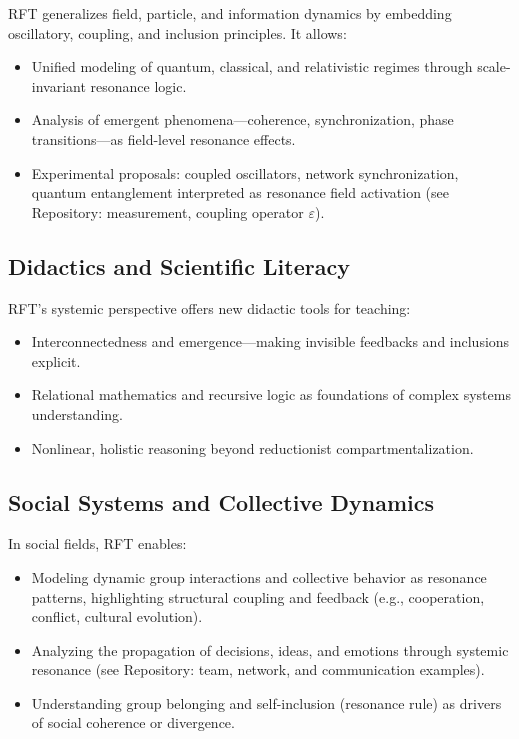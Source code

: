 \documentclass[12pt]{iopart}
\begin{document}
RFT generalizes field, particle, and information dynamics by embedding oscillatory, coupling, and inclusion principles. It allows:
\begin{itemize}
	\item Unified modeling of quantum, classical, and relativistic regimes through scale-invariant resonance logic.
	\item Analysis of emergent phenomena—coherence, synchronization, phase transitions—as field-level resonance effects.
	\item Experimental proposals: coupled oscillators, network synchronization, quantum entanglement interpreted as resonance field activation (see Repository: measurement, coupling operator $\varepsilon$).
\end{itemize}

\subsection{Didactics and Scientific Literacy}

RFT’s systemic perspective offers new didactic tools for teaching:
\begin{itemize}
	\item Interconnectedness and emergence—making invisible feedbacks and inclusions explicit.
	\item Relational mathematics and recursive logic as foundations of complex systems understanding.
	\item Nonlinear, holistic reasoning beyond reductionist compartmentalization.
\end{itemize}

\subsection{Social Systems and Collective Dynamics}

In social fields, RFT enables:
\begin{itemize}
	\item Modeling dynamic group interactions and collective behavior as resonance patterns, highlighting structural coupling and feedback (e.g., cooperation, conflict, cultural evolution).
	\item Analyzing the propagation of decisions, ideas, and emotions through systemic resonance (see Repository: team, network, and communication examples).
	\item Understanding group belonging and self-inclusion (resonance rule) as drivers of social coherence or divergence.
\end{itemize}
\end{document}
